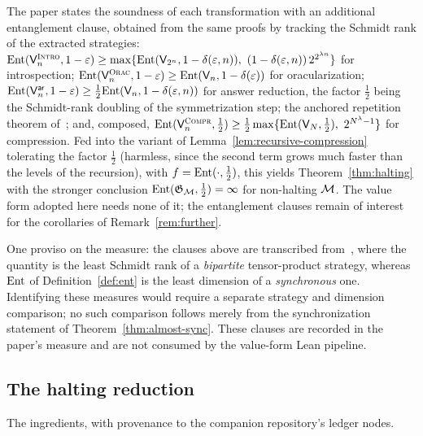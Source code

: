\begin{remark}
\label{rem:entanglement-form}
The paper states the soundness of each transformation with an additional entanglement
clause, obtained from the same proofs by tracking the Schmidt rank of the extracted
strategies: $\mathrm{Ent}(\mathsf{V}^{\textsc{Intro}}_n, 1 - \varepsilon) \geq \max\{\mathrm{Ent}(\mathsf{V}_{2^n}, 1 -
\delta(\varepsilon, n)),\ (1 - \delta(\varepsilon, n))\, 2^{2^{\lambda n}}\}$ for introspection;
$\mathrm{Ent}(\mathsf{V}^{\textsc{Orac}}_n, 1 - \varepsilon) \geq \mathrm{Ent}(\mathsf{V}_n, 1 - \delta(\varepsilon))$ for
oracularization; $\mathrm{Ent}(\mathsf{V}^{\mathsf{ar}}_n, 1 - \varepsilon) \geq \frac12 \mathrm{Ent}(\mathsf{V}_n, 1 - \delta(\varepsilon, n))$
for answer reduction, the factor $\frac12$ being the Schmidt-rank doubling of the
symmetrization step; the anchored repetition theorem of~\cite{BVY17}; and, composed,
$\mathrm{Ent}(\mathsf{V}^{\textsc{Compr}}_n, \frac12) \geq \frac12 \max\{\mathrm{Ent}(\mathsf{V}_N, \frac12),\
2^{N^\lambda - 1}\}$ for compression. Fed into the variant of
Lemma~\ref{lem:recursive-compression} tolerating the factor $\frac12$ (harmless, since
the second term grows much faster than the levels of the recursion), with $f =
\mathrm{Ent}(\cdot, \frac12)$, this yields Theorem~\ref{thm:halting} with the stronger
conclusion $\mathrm{Ent}(\mathfrak{G}_{\mathcal{M}}, \frac12) = \infty$ for non-halting $\mathcal{M}$. The
value form adopted here needs none of it; the entanglement clauses remain of interest for
the corollaries of Remark~\ref{rem:further}.

One proviso on the measure: the clauses above are transcribed from~\cite{JNVWY20}, where
the quantity is the least Schmidt rank of a \emph{bipartite} tensor-product strategy,
whereas $\mathrm{Ent}$ of Definition~\ref{def:ent} is the least dimension of a \emph{synchronous}
one. Identifying these measures would require a separate strategy and dimension
comparison; no such comparison follows merely from the synchronization statement of
Theorem~\ref{thm:almost-sync}. These clauses are recorded in the paper's measure and
are not consumed by the value-form Lean pipeline.
\end{remark}

\subsection{The halting reduction}
\label{sec:ps-halting}

The ingredients, with provenance to the companion repository's ledger nodes.

